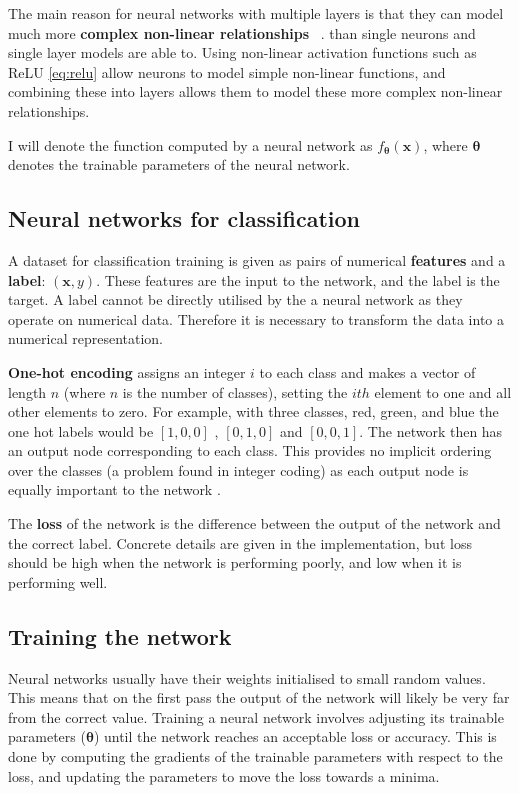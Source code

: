 \documentclass[12pt,a4paper,twoside,openright]{report}
\renewcommand{\vec}[1]{\bm{#1}}
\begin{document}
The main reason for neural networks with multiple layers is that they can model much more \textbf{complex non-linear relationships}
~\cite{Goodfellow-et-al-2016}. than single 
neurons and single layer models are able to. Using non-linear activation functions such as ReLU \eqref{eq:relu} allow neurons to model simple 
non-linear functions, and combining these into layers allows them to model these more complex non-linear relationships.

I will denote the function computed by a neural network as $f_{\vec{\theta}}(\vec{x})$, where $\vec{\theta}$ denotes the trainable parameters of the neural
network.

\subsection{Neural networks for classification}

A dataset for classification training is given as pairs of numerical \textbf{features} and a \textbf{label}: $(\vec{x}, y)$. These features are 
the input to the network,
and the label is the target. A label cannot be directly utilised by the a neural network as they operate on numerical data. Therefore it is 
necessary to transform the data into a numerical representation.

\textbf{One-hot encoding} assigns an integer $i$ to each class and makes a vector of length $n$ (where $n$ is the 
number of classes), setting the $ith$ element to one and all other elements to zero. For example, with three classes, red, green, and blue
the one hot labels would be $[1, 0, 0]$ , $[0, 1, 0]$ and $[0, 0, 1]$. The network then has an output node corresponding to each class.
This provides no implicit ordering over the classes (a problem found in integer coding) as each output node is equally important to the 
network \cite{WhyOneHo55:online}.

The \textbf{loss} of the network is the difference between the output of the network and the correct label. Concrete details are given 
in the implementation, but loss should be high when the network is performing poorly, and low when it is performing well.

\subsection{Training the network}

Neural networks usually have their weights initialised to small random values. This means that on the first pass
the output of the network will likely be very far from the correct value. Training a neural network involves adjusting its
trainable parameters ($\vec{\theta}$) until the network reaches an acceptable loss or accuracy. This is done by computing 
the gradients of the trainable parameters with respect to the loss, and updating the parameters to move the loss towards 
a minima.
\end{document}
